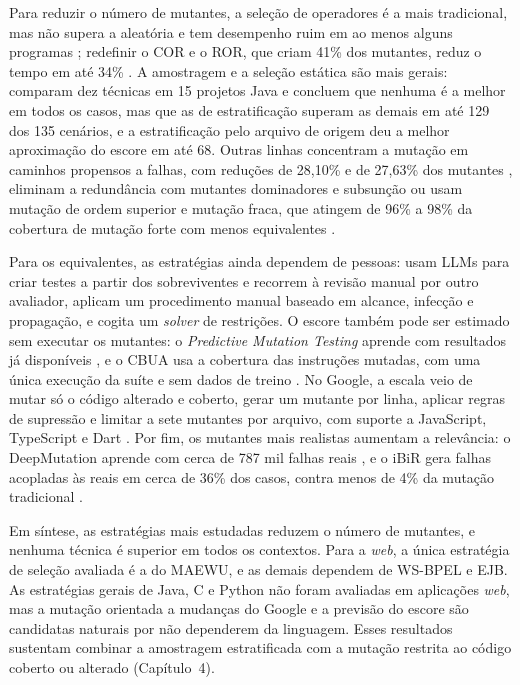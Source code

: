 Para reduzir o número de mutantes, a seleção de operadores é a mais tradicional, mas não supera a aleatória \cite{zhang2010} e tem desempenho ruim em ao menos alguns programas \cite{kurtz2016}; redefinir o COR e o ROR, que criam 41\% dos mutantes, reduz o tempo em até 34\% \cite{just2012}. A amostragem e a seleção estática são mais gerais:  comparam dez técnicas em 15 projetos Java e concluem que nenhuma é a melhor em todos os casos, mas que as de estratificação superam as demais em até 129 dos 135 cenários, e a estratificação pelo arquivo de origem deu a melhor aproximação do escore em até 68. Outras linhas concentram a mutação em caminhos propensos a falhas, com reduções de 28,10\% e de 27,63\% dos mutantes \cite{arasteh2022, arasteh2023}, eliminam a redundância com mutantes dominadores e subsunção \cite{kurtz2016, ojdanic2023} ou usam mutação de ordem superior e mutação fraca, que atingem de 96\% a 98\% da cobertura de mutação forte com menos equivalentes \cite{kintis2010}.

Para os equivalentes, as estratégias ainda dependem de pessoas:  usam LLMs para criar testes a partir dos sobreviventes e recorrem à revisão manual por outro avaliador,  aplicam um procedimento manual baseado em alcance, infecção e propagação, e  cogita um \textit{solver} de restrições. O escore também pode ser estimado sem executar os mutantes: o \textit{Predictive Mutation Testing} aprende com resultados já disponíveis \cite{zhang2019}, e o CBUA usa a cobertura das instruções mutadas, com uma única execução da suíte e sem dados de treino \cite{zhang2022}. No Google, a escala veio de mutar só o código alterado e coberto, gerar um mutante por linha, aplicar regras de supressão e limitar a sete mutantes por arquivo, com suporte a JavaScript, TypeScript e Dart \cite{petrovic2021}. Por fim, os mutantes mais realistas aumentam a relevância: o DeepMutation aprende com cerca de 787 mil falhas reais \cite{tufano2020}, e o iBiR gera falhas acopladas às reais em cerca de 36\% dos casos, contra menos de 4\% da mutação tradicional \cite{khanfir2023}.

Em síntese, as estratégias mais estudadas reduzem o número de mutantes, e nenhuma técnica é superior em todos os contextos. Para a \textit{web}, a única estratégia de seleção avaliada é a do MAEWU, e as demais dependem de WS-BPEL e EJB. As estratégias gerais de Java, C e Python não foram avaliadas em aplicações \textit{web}, mas a mutação orientada a mudanças do Google e a previsão do escore são candidatas naturais por não dependerem da linguagem. Esses resultados sustentam combinar a amostragem estratificada com a mutação restrita ao código coberto ou alterado (Capítulo~4).

